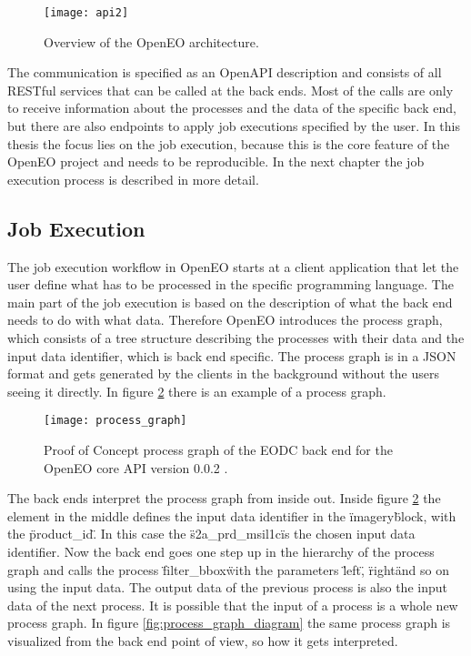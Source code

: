 \documentclass[draft,final]{vutinfth} %
\begin{document}
\begin{figure}[h]
	\centering
	\texttt{[image: api2]}
	\caption{Overview of the OpenEO architecture. \cite{openeo}}
	\label{fig:api2} %
\end{figure}


The communication is specified as an OpenAPI description and consists of all RESTful services that can be called at the back ends. Most of the calls are only to receive information about the processes and the data of the specific back end, but there are also endpoints to apply job executions specified by the user. In this thesis the focus lies on the job execution, because this is the core feature of the OpenEO project and needs to be reproducible. In the next chapter the job execution process is described in more detail. \cite{openeo}

\subsection{Job Execution}\label{Job Execution}
The job execution workflow in OpenEO starts at a client application that let the user define what has to be processed in the specific programming language.
The main part of the job execution is based on the description of what the back end needs to do with what data. Therefore OpenEO introduces the process graph, which consists of a tree structure describing the processes with their data and the input data identifier, which is back end specific. The process graph is in a JSON format and gets generated by the clients in the background without the users seeing it directly. In figure \ref{fig:process_graph} there is an example of a process graph. 

\begin{figure}[h]
	\centering
	\texttt{[image: process\_graph]}
	\caption{Proof of Concept process graph of the EODC back end for the OpenEO core API version 0.0.2 . \cite{openeo}}
	\label{fig:process_graph} %
\end{figure}
The back ends interpret the process graph from inside out. Inside figure \ref{fig:process_graph} the element in the middle defines the input data identifier in the \"imagery\" block, with the \"product\_id\". In this case the \"s2a\_prd\_msil1c\" is the chosen input data identifier. Now the back end goes one step up in the hierarchy of the process graph and calls the process \"filter\_bbox\" with the parameters \"left\", \"right\" and so on using the input data. The output data of the previous process is also the input data of the next process. It is possible that the input of a process is a whole new process graph. In figure \ref{fig:process_graph_diagram} the same process graph is visualized from the back end point of view, so how it gets interpreted. 
\end{document}
